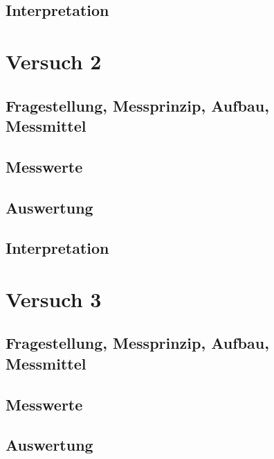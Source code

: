 \documentclass[12pt, oneside, a4paper, \docLanguage]{report}
\begin{document}
\section{Interpretation}
\label{chap:VERSUCH_1_INTERPRETATION}

%
%
\chapter{Versuch 2}
\label{chap:VERSUCH_2}

\section{Fragestellung, Messprinzip, Aufbau, Messmittel}
\label{chap:VERSUCH_2_FRAGESTELLUNG}

\section{Messwerte}
\label{chap:VERSUCH_2_MESSWERTE}

\section{Auswertung}
\label{chap:VERSUCH_2_AUSWERTUNG}

\section{Interpretation}
\label{chap:VERSUCH_2_INTERPRETATION}

%
%
\chapter{Versuch 3}
\label{chap:VERSUCH_3}

\section{Fragestellung, Messprinzip, Aufbau, Messmittel}
\label{chap:VERSUCH_3_FRAGESTELLUNG}

\section{Messwerte}
\label{chap:VERSUCH_3_MESSWERTE}

\section{Auswertung}
\label{chap:VERSUCH_3_AUSWERTUNG}
\end{document}
